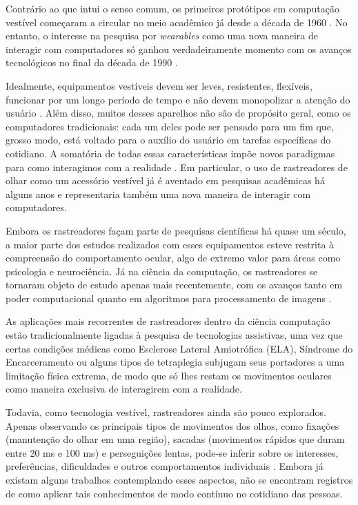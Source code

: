 \documentclass[12pt]{article}
\begin{document}
		Contrário ao que intui o senso comum, os primeiros protótipos em computação vestível começaram a circular no meio acadêmico já desde a década de 1960 \cite{Sutherland-1968}. No entanto, o interesse na pesquisa por \textit{wearables} como uma nova maneira de interagir com computadores só ganhou verdadeiramente momento com os avanços tecnológicos no final da década de 1990 \cite{Mann-1997}.
		
		Idealmente, equipamentos vestíveis devem ser leves, resistentes, flexíveis, funcionar por um longo período de tempo e não devem monopolizar a atenção do usuário \cite{Mann-1997}. Além disso, muitos desses aparelhos não são de propósito geral, como os computadores tradicionais: cada um deles pode ser pensado para um fim que, grosso modo, está voltado para o auxílio do usuário em tarefas específicas do cotidiano. A somatória de todas essas características impõe novos paradigmas para como interagimos com a realidade \cite{Starner-2001}. Em particular, o uso de rastreadores de olhar como um acessório vestível já é aventado em pesquisas acadêmicas há alguns anos \cite{Bulling-2009} e representaria também uma nova maneira de interagir com computadores. 
		
		Embora os rastreadores façam parte de pesquisas científicas há quase um século, a maior parte dos estudos realizados com esses equipamentos esteve restrita à compreensão do comportamento ocular, algo de extremo valor para áreas como psicologia e neurociência. Já na ciência da computação, os rastreadores se tornaram objeto de estudo apenas mais recentemente, com os avanços tanto em poder computacional quanto em algoritmos para processamento de imagens \cite{Duchowski-2002}.
		
		As aplicações mais recorrentes de rastreadores dentro da ciência computação estão tradicionalmente ligadas à pesquisa de tecnologias assistivas, uma vez que certas condições médicas como Esclerose Lateral Amiotrófica (ELA), Síndrome do Encarceramento ou alguns tipos de tetraplegia subjugam seus portadores a uma limitação física extrema, de modo que só lhes restam os movimentos oculares como maneira exclusiva de interagirem com a realidade.
		
		Todavia, como tecnologia vestível, rastreadores ainda são pouco explorados. Apenas observando os principais tipos de movimentos dos olhos, como fixações (manutenção do olhar em uma região), sacadas (movimentos rápidos que duram entre 20 ms e 100 ms) e perseguições lentas, pode-se inferir sobre os interesses, preferências, dificuldades e outros comportamentos individuais \cite{Reichle-1998}. Embora já existam alguns trabalhos contemplando esses aspectos, não se encontram registros de como aplicar tais conhecimentos de modo contínuo no cotidiano das pessoas.
		
\end{document}
